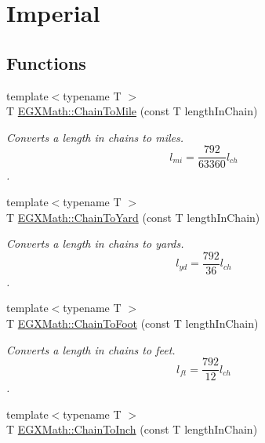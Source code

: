 \hypertarget{group___e_g_x_math-_conversions-_length_conversions-_imperial-_chain-_imperial}{}\section{Imperial}
\label{group___e_g_x_math-_conversions-_length_conversions-_imperial-_chain-_imperial}
\subsection*{Functions}
\begin{DoxyCompactItemize}
\item 
{\footnotesize template$<$typename T $>$ }\\T \mbox{\hyperlink{group___e_g_x_math-_conversions-_length_conversions-_imperial-_chain-_imperial_ga260b1e534400c8ee9ec5001641b2a451}{E\+G\+X\+Math\+::\+Chain\+To\+Mile}} (const T length\+In\+Chain)
\begin{DoxyCompactList}\small\item\em Converts a length in chains to miles. \[ l_{mi}=\frac{792}{63360} l_{ch} \]. \end{DoxyCompactList}\item 
{\footnotesize template$<$typename T $>$ }\\T \mbox{\hyperlink{group___e_g_x_math-_conversions-_length_conversions-_imperial-_chain-_imperial_ga9d6b8e5d2dfaf555b923e8ba2d324ae4}{E\+G\+X\+Math\+::\+Chain\+To\+Yard}} (const T length\+In\+Chain)
\begin{DoxyCompactList}\small\item\em Converts a length in chains to yards. \[ l_{yd}= \frac{792}{36} l_{ch} \]. \end{DoxyCompactList}\item 
{\footnotesize template$<$typename T $>$ }\\T \mbox{\hyperlink{group___e_g_x_math-_conversions-_length_conversions-_imperial-_chain-_imperial_gab1249a8d1535d07fcb4844d687133a49}{E\+G\+X\+Math\+::\+Chain\+To\+Foot}} (const T length\+In\+Chain)
\begin{DoxyCompactList}\small\item\em Converts a length in chains to feet. \[ l_{ft}= \frac{792}{12} l_{ch} \]. \end{DoxyCompactList}\item 
{\footnotesize template$<$typename T $>$ }\\T \mbox{\hyperlink{group___e_g_x_math-_conversions-_length_conversions-_imperial-_chain-_imperial_gabbb970d9c4833232722a01a846c30bc8}{E\+G\+X\+Math\+::\+Chain\+To\+Inch}} (const T length\+In\+Chain)

\end{DoxyCompactItemize}
